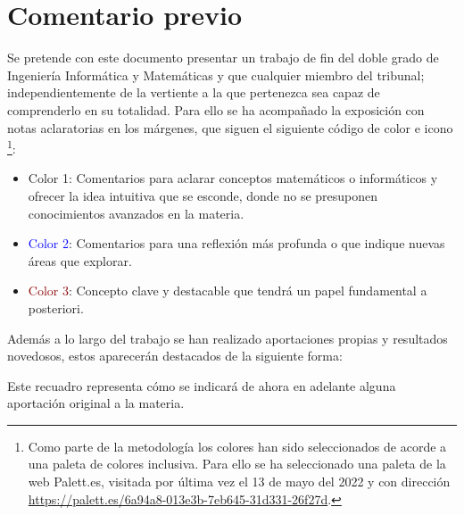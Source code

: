 
\section*{Comentario previo}

Se pretende con este documento presentar un  trabajo de fin del doble grado de Ingeniería Informática y Matemáticas y que cualquier miembro del tribunal; 
independientemente de la vertiente a la que pertenezca sea capaz de comprenderlo en su totalidad.  
Para ello se ha acompañado la exposición con notas aclaratorias en los márgenes, que siguen el siguiente código de color e icono \footnote{Como parte de la metodología los colores han sido seleccionados de acorde a una paleta de colores inclusiva.
Para ello se ha seleccionado una paleta de la web Palett.es, 
visitada por última vez el 13 de mayo del 2022 
y con dirección \url{https://palett.es/6a94a8-013e3b-7eb645-31d331-26f27d}.
 }: 

\begin{itemize}
    \item  \iconoAclaraciones \textcolor{dark_green}{ Color 1}: Comentarios para 
    aclarar conceptos matemáticos o informáticos y ofrecer la idea intuitiva que 
    se esconde, donde no se presuponen conocimientos avanzados en 
    la materia. 
    \item  \iconoProfundizar \textcolor{blue}{  Color 2}: Comentarios para una reflexión más profunda o que indique nuevas áreas que explorar. 
    \item  \iconoClave  \textcolor{darkRed}{  Color 3}: Concepto clave y destacable que tendrá un papel fundamental a posteriori.  
\end{itemize}

Además a lo largo del trabajo se han realizado aportaciones propias y resultados novedosos, estos aparecerán destacados de la siguiente forma: 

\begin{aportacionOriginal}
    Este recuadro representa cómo se indicará de ahora en adelante alguna aportación original a la materia. 
\end{aportacionOriginal}
